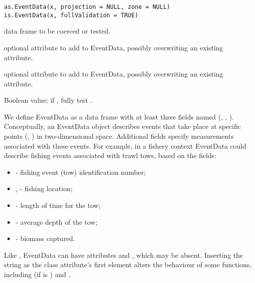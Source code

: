 \documentclass[letterpaper]{book}
\begin{document}
%
\begin{Usage}
\begin{verbatim}
as.EventData(x, projection = NULL, zone = NULL)
is.EventData(x, fullValidation = TRUE)
\end{verbatim}
\end{Usage}
%
\begin{Arguments}
\begin{ldescription}
\item[\code{x}] data frame to be coerced or tested.
\item[\code{projection}] optional  attribute to add to
EventData, possibly overwriting an existing attribute.
\item[\code{zone}] optional  attribute to add to EventData,
possibly overwriting an existing attribute.
\item[\code{fullValidation}] Boolean value; if , fully test
.
\end{ldescription}
\end{Arguments}
%
\begin{Details}\relax
We define EventData as a data frame with at least three fields named
(, , ). Conceptually, an EventData object describes events that
take place at specific points (, ) in two-dimensional
space. Additional fields specify measurements associated with these
events. For example, in a fishery context EventData could describe
fishing events associated with trawl tows, based on the fields:
\begin{itemize}

\item {} - fishing event (tow) identification number;
\item {},  - fishing location;
\item {} - length of time for the tow;
\item {} - average depth of the tow;
\item {} - biomass captured.

\end{itemize}

Like , EventData can have attributes 
and , which may be absent. Inserting the string
 as the class attribute's first element alters the
behaviour of some functions, including  (if
 is ) and .
\end{Details}
\end{document}
